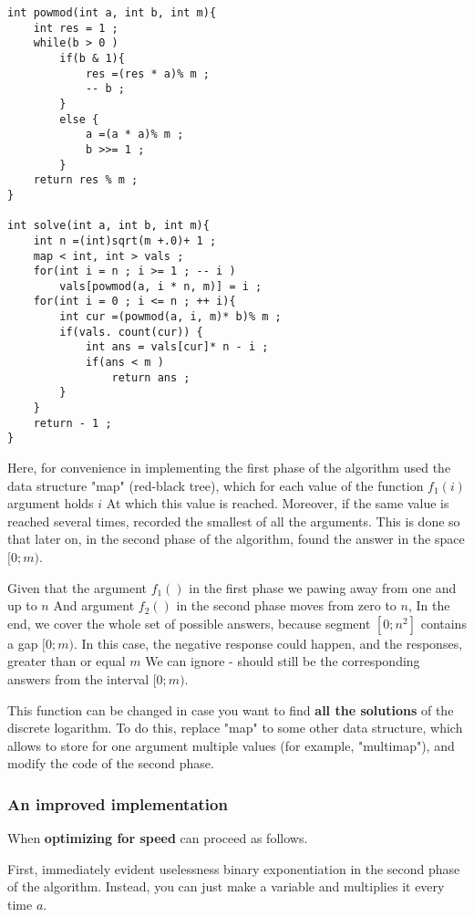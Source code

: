 \begin{verbatim}
int powmod(int a, int b, int m){
    int res = 1 ;
    while(b > 0 )
        if(b & 1){
            res =(res * a)% m ;
            -- b ;
        }
        else {
            a =(a * a)% m ;
            b >>= 1 ;
        }
    return res % m ;
}
 
int solve(int a, int b, int m){
    int n =(int)sqrt(m +.0)+ 1 ;
    map < int, int > vals ;
    for(int i = n ; i >= 1 ; -- i )
        vals[powmod(a, i * n, m)] = i ;
    for(int i = 0 ; i <= n ; ++ i){
        int cur =(powmod(a, i, m)* b)% m ;
        if(vals. count(cur)) {
            int ans = vals[cur]* n - i ;
            if(ans < m )
                return ans ;
        }
    }
    return - 1 ;
} 
\end{verbatim}
Here, for convenience in implementing the first phase of the algorithm used the data structure "map" (red-black tree), which for each value of the function $f_1 (i)$ argument holds $i$ At which this value is reached. Moreover, if the same value is reached several times, recorded the smallest of all the arguments. This is done so that later on, in the second phase of the algorithm, found the answer in the space $[0; m)$.

Given that the argument $f_1()$ in the first phase we pawing away from one and up to $n$ And argument $f_2()$ in the second phase moves from zero to $n$, In the end, we cover the whole set of possible answers, because segment $[0; n ^ 2]$ contains a gap $[0; m)$. In this case, the negative response could happen, and the responses, greater than or equal $m$ We can ignore - should still be the corresponding answers from the interval $[0; m)$.

This function can be changed in case you want to find \textbf{all the solutions} of the discrete logarithm. To do this, replace "map" to some other data structure, which allows to store for one argument multiple values ​​(for example, "multimap"), and modify the code of the second phase.

\subsubsection{ An improved implementation }

When \textbf{optimizing for speed} can proceed as follows.

First, immediately evident uselessness binary exponentiation in the second phase of the algorithm. Instead, you can just make a variable and multiplies it every time $a$.

